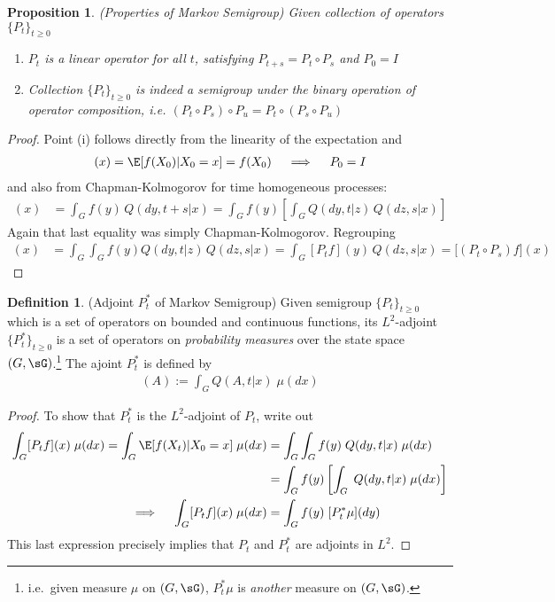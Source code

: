 \documentclass[12pt]{article}
\theoremstyle{plain}
\newtheorem{prop}[thm]{Proposition}
\theoremstyle{definition}
\newtheorem{defn}[thm]{Definition}
\theoremstyle{remark}
\begin{document}
\begin{prop}\emph{(Properties of Markov Semigroup)}
\label{markovsemiprop}
Given collection of operators $\{P_t\}_{t\geq 0}$
\begin{enumerate}[label=\emph{(\roman*)}]
  \item $P_t$ is a linear operator for all $t$, satisfying
    $P_{t+s}=P_t\circ P_s$ and $P_0=I$
  \item Collection $\{P_t\}_{t\geq 0}$ is indeed a semigroup under
    the binary operation of operator composition, i.e.
    $(P_t\circ P_s) \circ P_u = P_t\circ (P_s \circ P_u)$
\end{enumerate}
\end{prop}
\begin{proof}
Point (i) follows directly from the linearity of the expectation and
\begin{align*}
  [P_0f](x)
  =
  \E[f(X_0)|X_0=x]
  = f(X_0)
  \quad\implies\quad
  P_0=I
\end{align*}
and also from Chapman-Kolmogorov for time homogeneous processes:
\begin{align*}
  [P_{t+s}f](x)
  &=
  \int_G
  f(y)
  \,Q(dy,t+s|x)
  =
  \int_G
  f(y)
  \left[
  \int_{G}
  Q(dy,t|z)
  \, Q(dz,s|x)
  \right]
\end{align*}
Again that last equality was simply Chapman-Kolmogorov.
Regrouping
\begin{align*}
  [P_{t+s}f](x)
  &=
  \int_G
  \int_{G}
  f(y)
  Q(dy,t|z)
  \, Q(dz,s|x)
  =
  \int_G
  [P_tf](y)
  \, Q(dz,s|x)
  =
  \big[
  (P_t\circ P_s)
  f
  \big](x)
\end{align*}
\end{proof}

\begin{defn}(Adjoint $P_t^*$ of Markov Semigroup)
Given semigroup $\{P_t\}_{t\geq 0}$ which is a set of operators on
bounded and continuous functions, its $L^2$-adjoint
$\{P_t^*\}_{t\geq 0}$ is a set of operators on
\emph{probability measures} over the state space $(G,\sG)$.\footnote{%
  i.e.\ given measure $\mu$ on $(G,\sG)$, $P_t^*\mu$ is \emph{another}
  measure on $(G,\sG)$.
}
The ajoint $P_t^*$ is defined by
\begin{align}
  [P_t^*\mu](A)
  :=
  \int_G
  Q(A,t|x)
  \;\mu(dx)
  \label{Padjoint}
\end{align}
\end{defn}
\begin{proof}
To show that $P_t^*$ is the $L^2$-adjoint of $P_t$, write out
\begin{align*}
  \int_G
  [P_tf](x)
  \;\mu(dx)
  =
  \int_G
  \E[f(X_t)|X_0=x]
  \;\mu(dx)
  &=
  \int_G
  \int_G
  f(y)
  \;Q(dy,t|x)
  \;\mu(dx)
  \\
  &=
  \int_G
  f(y)
  \left[
  \int_G
  \;Q(dy,t|x)
  \;\mu(dx)
  \right]
  \\
  \implies\quad
  \int_G
  [P_tf](x)
  \;\mu(dx)
  &=
  \int_G
  f(y)
  \;
  [P_t^*\mu](dy)
\end{align*}
This last expression precisely implies that $P_t$ and $P_t^*$ are
adjoints in $L^2$.
\end{proof}
\end{document}
